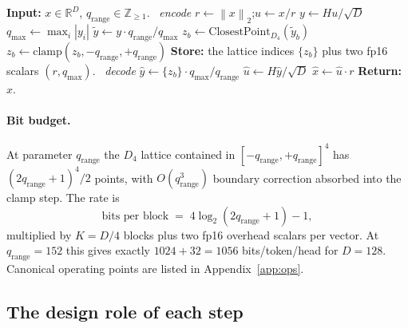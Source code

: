 \documentclass[11pt,a4paper]{article}
\theoremstyle{definition}
\theoremstyle{plain}
\newcommand{\R}{\mathbb{R}}
\newcommand{\Z}{\mathbb{Z}}
\newcommand{\norm}[1]{\left\lVert#1\right\rVert}
\begin{document}
\begin{algorithm}[H]
\caption{\textsc{KakeyaLattice}~v1.4 encode/decode (single vector)}
\label{alg:v14}
\begin{algorithmic}[1]
\State \textbf{Input:} $x \in \R^D$, $q_\mathrm{range}\in\Z_{\geq 1}$.
\Statex \hrulefill\ \emph{encode} \hrulefill
\State $r \gets \norm{x}_2$;\quad $u \gets x / r$ 
\State $y \gets H u / \sqrt{D}$ 
\State $q_\mathrm{max} \gets \max_i |y_i|$ 
\State $\tilde y \gets y \cdot q_\mathrm{range}/q_\mathrm{max}$ 
  \State $z_b \gets \mathrm{ClosestPoint}_{D_4}(\tilde y_b)$ 
  \State $z_b \gets \mathrm{clamp}(z_b, -q_\mathrm{range}, +q_\mathrm{range})$
\EndFor
\State \textbf{Store:} the lattice indices $\{z_b\}$ plus two fp16 scalars $(r, q_\mathrm{max})$.
\Statex \hrulefill\ \emph{decode} \hrulefill
\State $\hat y \gets \{z_b\} \cdot q_\mathrm{max}/q_\mathrm{range}$ 
\State $\hat u \gets H \hat y / \sqrt{D}$ 
\State $\hat x \gets \hat u \cdot r$ 
\State \textbf{Return:} $\hat x$.
\end{algorithmic}
\end{algorithm}

\paragraph{Bit budget.}
At parameter $q_\mathrm{range}$ the $D_4$ lattice contained in
$[-q_\mathrm{range},+q_\mathrm{range}]^4$ has
$(2q_\mathrm{range}+1)^4/2$ points, with $O(q_\mathrm{range}^3)$
boundary correction absorbed into the clamp step. The rate is
\begin{equation}
\label{eq:bits}
\text{bits per block} \;=\; 4\log_2(2q_\mathrm{range}+1) - 1,
\end{equation}
multiplied by $K = D/4$ blocks plus two fp16 overhead scalars per
vector. At $q_\mathrm{range}=152$ this gives exactly $1024+32 = 1056$
bits/token/head for $D = 128$. Canonical operating points are listed
in Appendix~\ref{app:ops}.

\subsection{The design role of each step}
\label{sec:codec-why}
\end{document}
